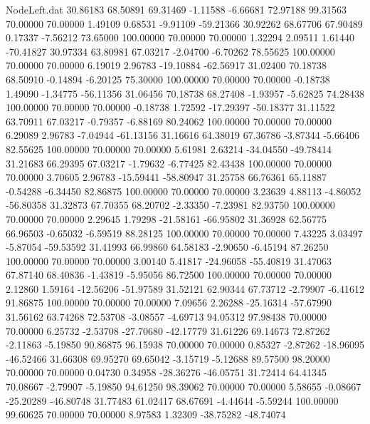 \begin{filecontents}{NodeLeft.dat}
  30.86183   68.50891   69.31469    -1.11588   -6.66681   72.97188   99.31563   70.00000   70.00000    1.49109    0.68531   -9.91109  -59.21366
  30.92262   68.67706   67.90489     0.17337   -7.56212   73.65000  100.00000   70.00000   70.00000    1.32294    2.09511    1.61440  -70.41827
  30.97334   63.80981   67.03217    -2.04700   -6.70262   78.55625  100.00000   70.00000   70.00000    6.19019    2.96783  -19.10884  -62.56917
  31.02400   70.18738   68.50910    -0.14894   -6.20125   75.30000  100.00000   70.00000   70.00000   -0.18738    1.49090   -1.34775  -56.11356
  31.06456   70.18738   68.27408    -1.93957   -5.62825   74.28438  100.00000   70.00000   70.00000   -0.18738    1.72592  -17.29397  -50.18377
  31.11522   63.70911   67.03217    -0.79357   -6.88169   80.24062  100.00000   70.00000   70.00000    6.29089    2.96783   -7.04944  -61.13156
  31.16616   64.38019   67.36786    -3.87344   -5.66406   82.55625  100.00000   70.00000   70.00000    5.61981    2.63214  -34.04550  -49.78414
  31.21683   66.29395   67.03217    -1.79632   -6.77425   82.43438  100.00000   70.00000   70.00000    3.70605    2.96783  -15.59441  -58.80947
  31.25758   66.76361   65.11887    -0.54288   -6.34450   82.86875  100.00000   70.00000   70.00000    3.23639    4.88113   -4.86052  -56.80358
  31.32873   67.70355   68.20702    -2.33350   -7.23981   82.93750  100.00000   70.00000   70.00000    2.29645    1.79298  -21.58161  -66.95802
  31.36928   62.56775   66.96503    -0.65032   -6.59519   88.28125  100.00000   70.00000   70.00000    7.43225    3.03497   -5.87054  -59.53592
  31.41993   66.99860   64.58183    -2.90650   -6.45194   87.26250  100.00000   70.00000   70.00000    3.00140    5.41817  -24.96058  -55.40819
  31.47063   67.87140   68.40836    -1.43819   -5.95056   86.72500  100.00000   70.00000   70.00000    2.12860    1.59164  -12.56206  -51.97589
  31.52121   62.90344   67.73712    -2.79907   -6.41612   91.86875  100.00000   70.00000   70.00000    7.09656    2.26288  -25.16314  -57.67990
  31.56162   63.74268   72.53708    -3.08557   -4.69713   94.05312   97.98438   70.00000   70.00000    6.25732   -2.53708  -27.70680  -42.17779
  31.61226   69.14673   72.87262    -2.11863   -5.19850   90.86875   96.15938   70.00000   70.00000    0.85327   -2.87262  -18.96095  -46.52466
  31.66308   69.95270   69.65042    -3.15719   -5.12688   89.57500   98.20000   70.00000   70.00000    0.04730    0.34958  -28.36276  -46.05751
  31.72414   64.41345   70.08667    -2.79907   -5.19850   94.61250   98.39062   70.00000   70.00000    5.58655   -0.08667  -25.20289  -46.80748
  31.77483   61.02417   68.67691    -4.44644   -5.59244  100.00000   99.60625   70.00000   70.00000    8.97583    1.32309  -38.75282  -48.74074

\end{filecontents}
